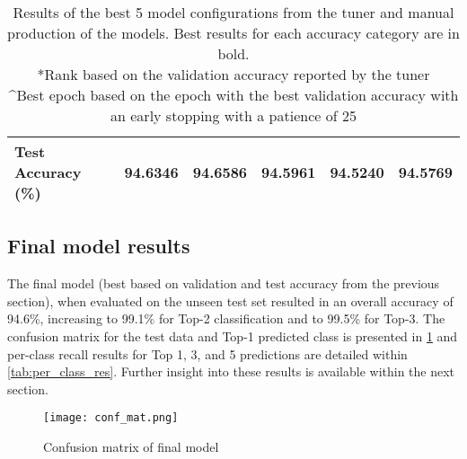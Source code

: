 \documentclass[12pt]{article}
\numberwithin{equation}{section}
\numberwithin{figure}{section}
\numberwithin{table}{section}
\begin{document}
\begin{table}[]
\begin{tabular}{|l|r|r|r|r|r|}
  \textbf{Test Accuracy (\%)}           & 94.6346                         & \textbf{94.6586}                & 94.5961                              & 94.5240                                   & 94.5769                         \\ \hline
  \end{tabular}
  \caption{Results of the best 5 model configurations from the tuner and manual production of the models. Best results for each accuracy category are in bold.\\
  \scriptsize{*Rank based on the validation accuracy reported by the tuner}\\
  \scriptsize{\textasciicircum{}Best epoch based on the epoch with the best validation accuracy with an early stopping with a patience of 25}}
  \label{tab:tuner_results}
  \end{table}

\subsection{Final model results}
The final model (best based on validation and test accuracy from the previous section), when evaluated on the unseen test set resulted in an overall accuracy of 94.6\%, increasing to 99.1\% for Top-2 classification and to 99.5\% for Top-3. The confusion matrix for the test data and Top-1 predicted class is presented in \cref{fig:conf_mat} and per-class recall results for Top 1, 3, and 5 predictions are detailed within \cref{tab:per_class_res}. Further insight into these results is available within the next section.

\begin{figure}
	\centering
	\captionsetup{justification=centering}
	\texttt{[image: conf\_mat.png]}
	\caption{Confusion matrix of final model}
	\label{fig:conf_mat}
\end{figure}
\end{document}
